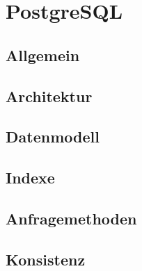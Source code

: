 \chapter{PostgreSQL}
\section{Allgemein}
\section{Architektur}
\section{Datenmodell}
\section{Indexe}
\section{Anfragemethoden}
\section{Konsistenz}